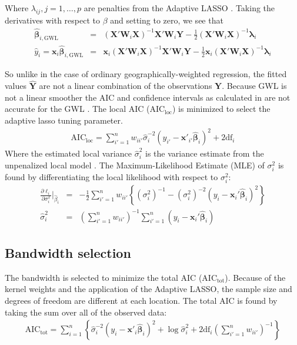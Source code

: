 \documentclass[authoryear, review, 11pt]{elsarticle}
\begin{document}
	Where $\lambda_{ij}, j =1, \dots, p$ are penalties from the Adaptive LASSO \citep{Zou:2006}. Taking the derivatives with respect to $\beta$ and setting to zero, we see that
	\begin{eqnarray}
		\hat{\bm{\beta}}_{i, \mbox{GWL}} &=& \left( \bm{X}'\bm{W}_i\bm{X} \right)^{-1}  \bm{X}'\bm{W}_i\bm{Y}  - \frac{1}{2} \left(\bm{X}'\bm{W}_i\bm{X} \right)^{-1} \bm{\lambda}_i\\
		\hat{y}_i = \bm{x}_i \hat{\bm{\beta}}_{i, \mbox{GWL}} &=&  \bm{x}_i \left( \bm{X}'\bm{W}_i\bm{X} \right)^{-1}  \bm{X}'\bm{W}_i\bm{Y}  - \frac{1}{2} \bm{x}_i \left(\bm{X}'\bm{W}_i\bm{X} \right)^{-1} \bm{\lambda}_i
	\end{eqnarray}
	
	So unlike in the case of ordinary geographically-weighted regression, the fitted values $\hat{\bm{Y}}$ are not a linear combination of the observations $\bm{Y}$. Because GWL is not a linear smoother the AIC and confidence intervals as calculated in \cite{Fotheringham:2002} are not accurate for the GWL \citep{Zou:2006}. The local AIC ($\mbox{AIC}_{\mbox{loc}}$) is minimized to select the adaptive lasso tuning parameter.
	\begin{eqnarray}
		\mbox{AIC}_{\mbox{loc}} = \sum_{i'=1}^n w_{ii'} \hat{\sigma}_i^{-2} \left( y_{i'} - \bm{x}'_{i'} \hat{\bm{\beta}}_i \right)^2 + 2 \mbox{df}_i
	\end{eqnarray}	
	Where the estimated local variance $\hat{\sigma}_i^2$ is the variance estimate from the unpenalized local model \citep{Zou:2007}. The Maximum-Likelihood Estimate (MLE) of $\sigma_i^2$ is found by differentiating the local likelihood with respect to $\sigma_i^2$:\\
	
	\begin{eqnarray}
		\frac{\partial \ell_i}{\partial \sigma_i^2} \bigg|_{\hat{\beta}_i} &=& -\frac{1}{2} \sum_{i'=1}^n w_{ii'} \left\{ \left(\sigma_i^{2}\right)^{-1} - \left(\sigma_i^{2}\right)^{-2} \left( y_i - \bm{x}_i'\bm{\hat{\beta}}_i \right)^2 \right\} \\
		\hat{\sigma}_i^2 &=& \left(\sum_{i'=1}^n w_{ii'}\right)^{-1} \sum_{i'=1}^n \left(y_i - \bm{x}_i'\hat{\bm{\beta}}_i\right)
	\end{eqnarray}
	 
	\subsection{Bandwidth selection}
	The bandwidth is selected to minimize the total AIC ($\mbox{AIC}_{\mbox{tot}}$). Because of the kernel weights and the application of the Adaptive LASSO, the sample size and degrees of freedom are different at each location. The total AIC is found by taking the sum over all of the observed data:		
	\begin{eqnarray}\label{eq:total-AIC}
		\mbox{AIC}_{\mbox{tot}} = \sum_{i=1}^n \left\{ \hat{\sigma}_i^{-2} \left( y_i - \bm{x}'_i \hat{\bm{\beta}}_i \right)^2 + \log \hat{\sigma}_i^2 + 2 \mbox{df}_i \left(\sum_{i'=1}^n w_{ii'} \right)^{-1} \right\}
	\end{eqnarray}
			
\end{document}
